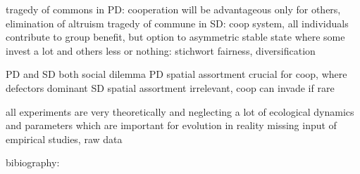 \documentclass[DIV=calc, paper=a4, fontsize=11pt, twocolumn]{scrartcl}	 %
\begin{document}
tragedy of commons in PD: cooperation will be advantageous only for others, elimination of altruism 
tragedy of commune in SD: coop system, all individuals contribute to group benefit, but option to asymmetric stable state where some invest a lot and others less or nothing: stichwort fairness, diversification

PD and SD both social dilemma
PD spatial assortment crucial for coop, where defectors dominant
SD spatial assortment irrelevant, coop can invade if rare

all experiments are very theoretically and neglecting a lot of ecological dynamics and parameters which are important for evolution in reality
missing input of empirical studies, raw data







bibiography: 

\nocite{Albizu2013}



\end{document}
